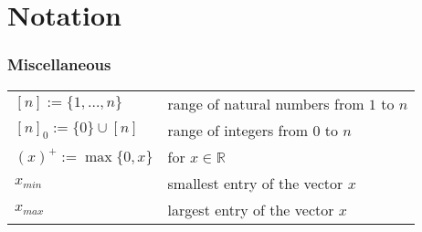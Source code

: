 \chapter*{Notation}\label{chapter:notation}

\subsection*{Miscellaneous}

\begin{tabular}{ll}
    $[n] := \{1, \dots, n\}$ & range of natural numbers from $1$ to $n$ \\
    $[n]_0 := \{0\} \cup [n]$ & range of integers from $0$ to $n$ \\
    $(x)^+ := \max\{0, x\}$ & for $x \in \mathbb{R}$ \\
    $x_{min}$ & smallest entry of the vector $x$ \\
    $x_{max}$ & largest entry of the vector $x$ \\
\end{tabular}
